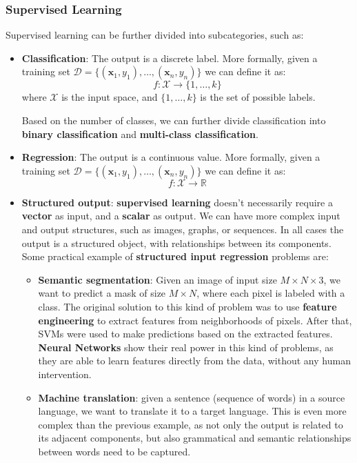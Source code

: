 \subsubsection{Supervised Learning}
Supervised learning can be further divided into subcategories, such as:
\begin{itemize}
    \item \textbf{Classification}: The output is a discrete label. More formally, given a training set $\mathcal{D} = \{(\mathbf{x}_1, y_1), \dots, (\mathbf{x}_n, y_n)\}$ we can define it as:
    \begin{equation}
        f: \mathcal{X} \rightarrow \{1,\dots,k\}
    \end{equation}
    where $\mathcal{X}$ is the input space, and $\{1,\dots,k\}$ is the set of possible labels.
    
    Based on the number of classes, we can further divide classification into \textbf{binary classification} and \textbf{multi-class classification}.
    
    \item \textbf{Regression}: The output is a continuous value. More formally, given a training set $\mathcal{D} = \{(\mathbf{x}_1, y_1), \dots, (\mathbf{x}_n, y_n)\}$ we can define it as:
    \begin{equation}
        f: \mathcal{X} \rightarrow \mathbb{R}
    \end{equation}
    
    \item \textbf{Structured output}: \textbf{supervised learning} doesn't necessarily require a \textbf{vector} as input, and a \textbf{scalar} as output.
    We can have more complex input and output structures, such as images, graphs, or sequences.
    In all cases the output  is a structured object, with relationships between its components.
    Some practical example of \textbf{structured input regression} problems are:
    
    \begin{itemize}
        \item \textbf{Semantic segmentation}: Given an image of input size $M \times N \times 3$, we
        want to predict a mask of size $M \times N$, where each pixel is labeled with a class.
        The original solution to this kind of problem was to use \textbf{feature engineering} to extract features from neighborhoods of pixels. After that,
        SVMs were used to make predictions based on the extracted features. \textbf{Neural Networks} show their real power in this kind of problems,
        as they are able to learn features directly from the data, without any human intervention.
        
        \item \textbf{Machine translation}: given a sentence (sequence of words) in a source language, we want to translate it
        to a target language. This is even more complex than the previous example, as not only the output is related to its adjacent components,
        but also grammatical and semantic relationships between words need to be captured.
    \end{itemize}
\end{itemize}

